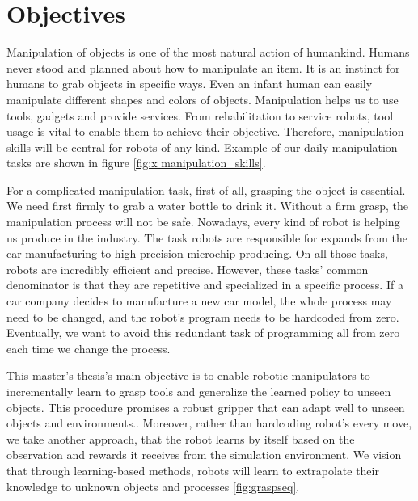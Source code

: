 \section{Objectives}

Manipulation of objects is one of the most natural action of humankind. Humans never stood and planned about how to manipulate an item. It is an instinct for humans to grab objects in specific ways. Even an infant human can easily manipulate different shapes and colors of objects. Manipulation helps us to use tools, gadgets and provide services. From rehabilitation to service robots, tool usage is vital to enable them to achieve their objective.
Therefore, manipulation skills will be central for robots of any kind. 
Example of our daily manipulation tasks are shown in figure \ref{fig:x manipulation_skills}.

For a complicated manipulation task, first of all, grasping the object is essential. We need first firmly to grab a water bottle to drink it.
Without a firm grasp, the manipulation process will not be safe. 
Nowadays, every kind of robot is helping us produce in the industry. The task robots are responsible for expands from the car manufacturing to high precision microchip producing. On all those tasks, robots are incredibly efficient and precise. However, these tasks' common denominator is that they are repetitive and specialized in a specific process. If a car company decides to manufacture a new car model, the whole process may need to be changed, and the robot's program needs to be hardcoded from zero. Eventually, we want to avoid this redundant task of programming all from zero each time we change the process.

This master's thesis's main objective is to enable robotic 
manipulators to incrementally learn to grasp tools and generalize the learned policy to unseen objects. This procedure promises a robust gripper that can adapt well to unseen objects and environments.. Moreover, rather than hardcoding robot's every move, we take another approach, that the robot learns by itself based on the observation and rewards it receives from the simulation environment. We vision that through learning-based methods, robots will learn to extrapolate their knowledge to unknown objects and processes \ref{fig:graspseq}.

